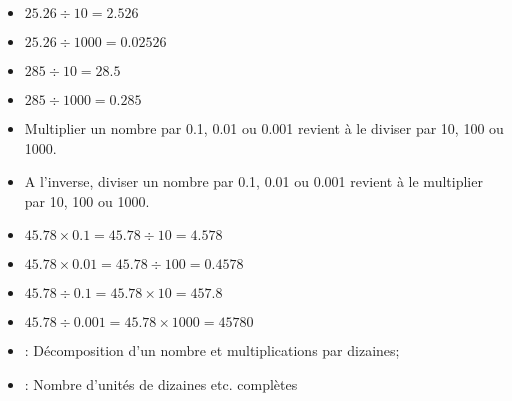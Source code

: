 	\begin{myexs}
		\begin{multicols}{2}
			\begin{itemize}
				\item $\num{25.26} \div 10 = \num{2.526}$ 
				\item $\num{25.26} \div 1000 = \num{0.02526} $
				\item $\num{285} \div 10 = \num{28.5} $ 
				\item $\num{285} \div 1000 = \num{0.285}$ 
			\end{itemize}	
		\end{multicols}
		
	\end{myexs}

	\begin{myprops}
		\begin{itemize}
			\item Multiplier un nombre par \num{0.1}, \num{0.01} ou \num{0.001} revient à le diviser par 10, 100 ou 1000.
			
			\item A l'inverse, diviser un nombre par \num{0.1}, \num{0.01} ou \num{0.001} revient à le multiplier par 10, 100 ou 1000.
		\end{itemize}
	\end{myprops}

	\begin{myexs}
			\begin{itemize}
				\item $\num{45.78} \times \num{0.1} = \num{45.78} \div \num{10} = \num{4.578}$ 
				\item $\num{45.78} \times \num{0.01} = \num{45.78} \div \num{100} = \num{0.4578}$ 
				\item $\num{45.78} \div \num{0.1} = \num{45.78} \times \num{10} = \num{457.8}$ 
				\item $\num{45.78} \div \num{0.001} = \num{45.78} \times \num{1000} = \num{45780}$ 
			\end{itemize}	
		
	\end{myexs}

	\begin{myexos}
		\begin{itemize}
			\item {} : Décomposition d'un nombre et multiplications par dizaines;
			\item {} : Nombre d'unités de dizaines etc. complètes
			
		\end{itemize}
	\end{myexos}

